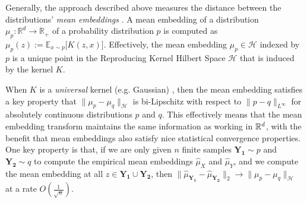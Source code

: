 Generally, the approach described above measures the distance between the distributions' \emph{mean embeddings} \cite{muandet2017kernel}.  A mean embedding of a distribution $\mu_p:\mathbb{R}^d\rightarrow \mathbb{R}_+$ of a probability distribution $p$ is computed as
$   \mu_p(z) := \mathbb{E}_{x\sim p} \big[K(z,x)\big].$
Effectively, the mean embedding $\mu_p\in\mathcal{H}$ indexed by $p$ is a unique point in the Reproducing Kernel Hilbert Space $\mathcal{H}$ that is induced by the kernel $K$.



When $K$ is a \emph{universal} kernel (e.g. Gaussian) \cite{micchelli2006universal}, then the mean embedding satisfies a key property that $\|\mu_p - \mu_q\|_\mathcal{H}$ %
is bi-Lipschitz with respect to $\|p - q\|_{L^{\infty}}$ for absolutely continuous distributions $p$ and $q$.  This effectively means that the mean embedding transform maintains the same information as working in $\mathbb{R}^d$, with the benefit that mean embeddings also satisfy nice statistical convergence properties.  One key property is that, if we are only given $n$ finite samples $\mathbf{Y_1}\sim p$ and $\mathbf{Y_2}\sim q$ to compute the empirical mean embeddings $\widehat{\mu}_X$ and $\widehat{\mu}_Y$, and we compute the mean embedding at all $z\in \mathbf{Y_1}\cup \mathbf{Y_2}$, then $\|\widehat{\mu}_\mathbf{Y_1} - \widehat{\mu}_\mathbf{Y_2}\|_2 \rightarrow \|\mu_p - \mu_q\|_\mathcal{H}$ at a rate $O\left(\frac{1}{\sqrt{n}}\right)$.  


